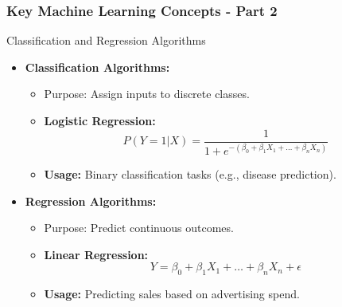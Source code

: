 \documentclass[aspectratio=169]{beamer}
\begin{document}
\begin{frame}[fragile]
    \frametitle{Key Machine Learning Concepts - Part 2}
    \begin{block}{Classification and Regression Algorithms}
        \begin{itemize}
            \item \textbf{Classification Algorithms:}
                \begin{itemize}
                    \item Purpose: Assign inputs to discrete classes.
                    \item \textbf{Logistic Regression:}
                        \begin{equation}
                            P(Y=1|X) = \frac{1}{1 + e^{-(\beta_0 + \beta_1X_1 + \ldots + \beta_nX_n)}}
                        \end{equation}
                        \item \textbf{Usage:} Binary classification tasks (e.g., disease prediction).
                \end{itemize}
            \item \textbf{Regression Algorithms:}
                \begin{itemize}
                    \item Purpose: Predict continuous outcomes.
                    \item \textbf{Linear Regression:}
                        \begin{equation}
                            Y = \beta_0 + \beta_1X_1 + \ldots + \beta_nX_n + \epsilon
                        \end{equation}
                        \item \textbf{Usage:} Predicting sales based on advertising spend.
                \end{itemize}
        \end{itemize}
    \end{block}
\end{frame}
\end{document}
